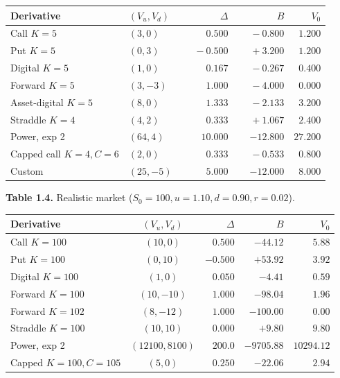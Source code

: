 \documentclass[
  10pt,
  twoside]{book}
\newcounter{none} %
\begin{document}
{\def\LTcaptype{none} %
\begin{table}[H]
\centering
\begin{tabular}{|l|l|r|r|r|}
\toprule
Derivative & \((V_u,V_d)\) & \(\Delta\) & \(B\) & \(V_0\) \\
\midrule



Call \(K=5\) & \((3,0)\) & \(\phantom{-0}0.500\) &
\(\phantom{+0}-0.800\) & \(\phantom{0}1.200\) \\
Put \(K=5\) & \((0,3)\) & \(\phantom{-0}-0.500\) &
\(\phantom{00}+3.200\) & \(\phantom{0}1.200\) \\
Digital \(K=5\) & \((1,0)\) & \(\phantom{-0}0.167\) &
\(\phantom{+0}-0.267\) & \(\phantom{0}0.400\) \\
Forward \(K=5\) & \((3,-3)\) & \(\phantom{-0}1.000\) &
\(\phantom{+0}-4.000\) & \(\phantom{0}0.000\) \\
Asset-digital \(K=5\) & \((8,0)\) & \(\phantom{-0}1.333\) &
\(\phantom{+0}-2.133\) & \(\phantom{0}3.200\) \\
Straddle \(K=4\) & \((4,2)\) & \(\phantom{-0}0.333\) &
\(\phantom{00}+1.067\) & \(\phantom{0}2.400\) \\
Power, exp 2 & \((64,4)\) & \(10.000\) & \(-12.800\) & \(27.200\) \\
Capped call \(K=4,C=6\) & \((2,0)\) & \(\phantom{-0}0.333\) &
\(\phantom{+0}-0.533\) & \(\phantom{0}0.800\) \\
Custom & \((25,-5)\) & \(\phantom{-0}5.000\) & \(-12.000\) &
\(\phantom{0}8.000\) \\
\bottomrule
\end{tabular}
\end{table}
}

\textbf{Table 1.4.} Realistic market (\(S_0=100,u=1.10,d=0.90,r=0.02\)).

{\def\LTcaptype{none} %
\begin{table}[H]
\centering
\begin{tabular}{|l|c|r|r|r|}
\toprule
Derivative & \((V_u,V_d)\) & \(\Delta\) & \(B\) & \(V_0\) \\
\midrule



Call \(K{=}100\) & \((10,0)\) & \(0.500\) & \(-44.12\) & \(5.88\) \\
Put \(K{=}100\) & \((0,10)\) & \(-0.500\) & \(+53.92\) & \(3.92\) \\
Digital \(K{=}100\) & \((1,0)\) & \(0.050\) & \(-4.41\) & \(0.59\) \\
Forward \(K{=}100\) & \((10,-10)\) & \(1.000\) & \(-98.04\) &
\(1.96\) \\
Forward \(K{=}102\) & \((8,-12)\) & \(1.000\) & \(-100.00\) &
\(0.00\) \\
Straddle \(K{=}100\) & \((10,10)\) & \(0.000\) & \(+9.80\) & \(9.80\) \\
Power, exp 2 & \((12100,8100)\) & \(200.0\) & \(-9705.88\) &
\(10294.12\) \\
Capped \(K{=}100,C{=}105\) & \((5,0)\) & \(0.250\) & \(-22.06\) &
\(2.94\) \\
\bottomrule
\end{tabular}
\end{table}
}
\end{document}
